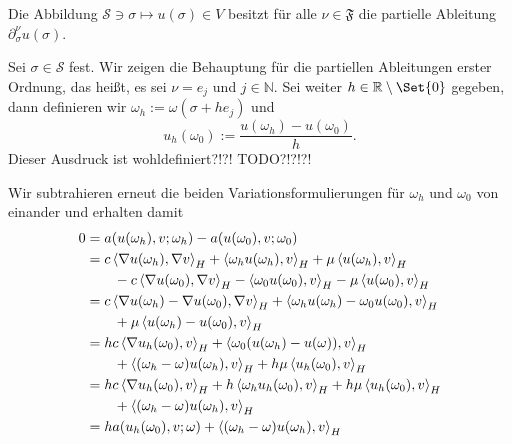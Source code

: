 \begin{Satz}
    Die Abbildung $\mathcal S \ni \sigma \mapsto u(\sigma) \in V$ besitzt für alle $\nu \in \mathfrak F$ die partielle Ableitung $\partial^{\nu}_{\sigma} u(\sigma)$.

    \begin{Beweis}
        Sei $\sigma \in \mathcal S$ fest.
        Wir zeigen die Behauptung für die partiellen Ableitungen erster Ordnung, das heißt, es sei $\nu = e_{j}$ und $j \in \mathbb{N}$.
        Sei weiter $h \in \mathbb{R} \setminus \Set{ 0 }$ gegeben, dann definieren wir $\omega_{h} := \omega(\sigma + h e_{j})$ und
        \begin{equation}
            u_{h}(\omega_{0}) := \frac{u(\omega_{h}) - u(\omega_{0})}{h}.
        \end{equation}
        Dieser Ausdruck ist wohldefiniert?!?! TODO?!?!?!

        Wir subtrahieren erneut die beiden Variationsformulierungen für $\omega_{h}$ und $\omega_{0}$ von einander und erhalten damit
        \begin{align}
            0
                &=  a(u(\omega_{h}), v; \omega_{h})
                    - a(u(\omega_{0}), v; \omega_{0})
            \\  &=
                    c \left\langle\nabla u(\omega_{h}),\nabla v\right\rangle_{H}
                    + \left\langle\omega_{h} u(\omega_{h}),v\right\rangle_{H}
                    + \mu \left\langle u(\omega_{h}),v\right\rangle_{H}
            \\&\qquad
                    - c \left\langle\nabla u(\omega_{0}),\nabla v\right\rangle_{H}
                    - \left\langle\omega_{0} u(\omega_{0}),v\right\rangle_{H}
                    - \mu \left\langle u(\omega_{0}),v\right\rangle_{H}
            \\  &=
                    c \left\langle\nabla u(\omega_{h}) - \nabla u(\omega_{0}),\nabla v\right\rangle_{H}
                    + \left\langle\omega_{h} u(\omega_{h}) - \omega_{0} u(\omega_{0}),v\right\rangle_{H}
            \\&\qquad
                    + \mu \left\langle u(\omega_{h}) - u(\omega_{0}),v\right\rangle_{H}
            \\  &=
                    h c \left\langle\nabla u_{h}(\omega_{0}),v\right\rangle_{H}
                    + \left\langle\omega_{0} ( u(\omega_{h}) - u(\omega) ) ,v\right\rangle_{H}
            \\&\qquad
                    + \left\langle(\omega_{h} - \omega) u(\omega_{h}),v\right\rangle_{H}
                    + h \mu \left\langle u_{h}(\omega_{0}),v\right\rangle_{H}
            \\  &=
                    h c \left\langle\nabla u_{h}(\omega_{0}),v\right\rangle_{H}
                    + h \left\langle\omega_{h} u_{h}(\omega_{0}) ,v\right\rangle_{H}
                    + h \mu \left\langle u_{h}(\omega_{0}),v\right\rangle_{H}
            \\&\qquad
                    + \left\langle(\omega_{h} - \omega) u(\omega_{h}),v\right\rangle_{H}
            \\  &=
                    h a(u_{h}(\omega_{0}), v; \omega)
                    + \left\langle(\omega_{h} - \omega) u(\omega_{h}),v\right\rangle_{H}
        \end{align}
    \end{Beweis}
\end{Satz}

